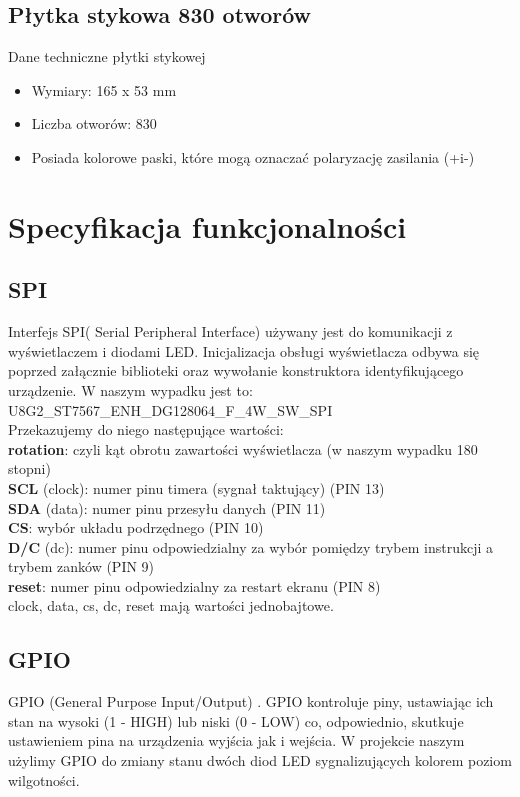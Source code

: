 \documentclass{classrep}
\begin{document}
\subsection {Płytka stykowa 830 otworów}
Dane techniczne płytki stykowej
\begin{itemize}
  \item Wymiary: 165 x 53 mm
  \item Liczba otworów: 830
  \item Posiada kolorowe paski, które mogą oznaczać polaryzację zasilania (+i-)
\end{itemize}

\section {Specyfikacja funkcjonalności}
\subsection {SPI}
Interfejs SPI( Serial Peripheral Interface) używany jest do komunikacji z wyświetlaczem i diodami LED. Inicjalizacja obsługi wyświetlacza odbywa się poprzed załącznie biblioteki oraz wywołanie konstruktora identyfikującego urządzenie. W naszym wypadku jest to:\\ U8G2\_ST7567\_ENH\_DG128064\_F\_4W\_SW\_SPI\\

Przekazujemy do niego następujące wartości:\\
\textbf{rotation}: czyli kąt obrotu zawartości wyświetlacza (w naszym wypadku 180 stopni)\\
\textbf{SCL} (clock): numer pinu timera (sygnał taktujący) (PIN 13)\\
\textbf{SDA} (data): numer pinu przesyłu danych (PIN 11)\\
\textbf{CS}: wybór układu podrzędnego (PIN 10)\\
\textbf{D/C} (dc): numer pinu odpowiedzialny za wybór pomiędzy trybem instrukcji a trybem zanków (PIN 9)\\
\textbf{reset}: numer pinu odpowiedzialny za restart ekranu (PIN 8)\\

clock, data, cs, dc, reset mają wartości jednobajtowe.\\
\subsection {GPIO}
GPIO (General Purpose Input/Output) . GPIO kontroluje piny, ustawiając ich stan na wysoki (1 - HIGH) lub
niski (0 - LOW) co, odpowiednio, skutkuje ustawieniem pina na urządzenia wyjścia jak i wejścia.
W projekcie naszym użylimy GPIO do zmiany stanu dwóch diod LED sygnalizujących kolorem poziom wilgotności. 
\end{document}
